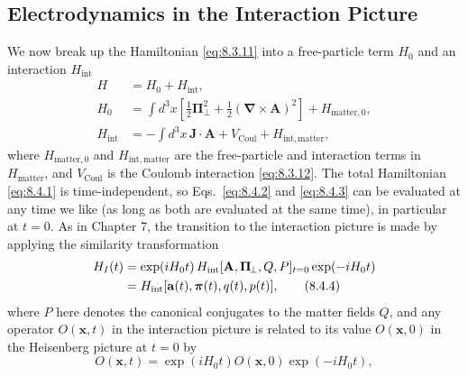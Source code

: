
\subsection{Electrodynamics in the Interaction Picture}

We now break up the Hamiltonian \eqref{eq:8.3.11} into a free-particle term $H_0$
and an interaction $H_{\mathrm{int}}$
\begin{align}
H&=H_0+H_{\mathrm{int}},
\tag{8.4.1}\label{eq:8.4.1}\\
H_0&=\int d^3x\left[
  \frac12\boldsymbol\Pi_{\!\perp}^{2}
  +\frac12(\boldsymbol\nabla\times\mathbf A)^2
  \right]+H_{\mathrm{matter},0},
\tag{8.4.2}\label{eq:8.4.2}\\
H_{\mathrm{int}}&=-\int d^3x\,\mathbf J\cdot\mathbf A
  +V_{\mathrm{Coul}}+H_{\mathrm{int,matter}},
\tag{8.4.3}\label{eq:8.4.3}
\end{align}
where $H_{\mathrm{matter},0}$ and $H_{\mathrm{int,matter}}$ are the
free-particle and interaction terms in $H_{\mathrm{matter}}$, and
$V_{\mathrm{Coul}}$ is the Coulomb interaction \eqref{eq:8.3.12}. The total Hamiltonian
\eqref{eq:8.4.1} is time-independent, so Eqs.~\eqref{eq:8.4.2} and \eqref{eq:8.4.3} can be evaluated at
any time we like (as long as both are evaluated at the same time), in
particular at $t=0$. As in Chapter 7, the transition to the interaction
picture is made by applying the similarity transformation
\begin{align}
H_I(t)
&=\exp(iH_0t)\,
  H_{\mathrm{int}}[\mathbf A,\boldsymbol\Pi_{\!\perp},Q,P]_{t=0}
  \exp(-iH_0t)
\notag\\
&=H_{\mathrm{int}}[\mathbf a(t),\boldsymbol\pi(t),q(t),p(t)],
\tag{8.4.4}\label{eq:8.4.4}
\end{align}
where $P$ here denotes the canonical conjugates to the matter fields $Q$, and
any operator $O(\mathbf x,t)$ in the interaction picture is related to its
value $O(\mathbf x,0)$ in the Heisenberg picture at $t=0$ by
\begin{equation}
O(\mathbf x,t)=\exp(iH_0t)O(\mathbf x,0)\exp(-iH_0t),
\tag{8.4.5}\label{eq:8.4.5}
\end{equation}
